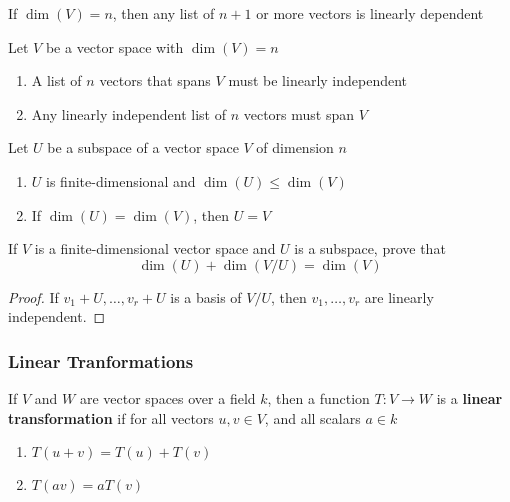 \documentclass[11pt]{article}
\begin{document}
\begin{corollary}[]
If \(\dim(V)=n\), then any list of \(n+1\) or more vectors is linearly dependent
\end{corollary}

\begin{corollary}[]
Let \(V\) be a vector space with \(\dim(V)=n\)
\begin{enumerate}
\item A list of \(n\) vectors that spans \(V\) must be linearly independent
\item Any linearly independent list of \(n\) vectors must span \(V\)
\end{enumerate}
\end{corollary}

\begin{corollary}[]
Let \(U\) be a subspace of a vector space \(V\) of dimension \(n\)
\begin{enumerate}
\item \(U\) is finite-dimensional and \(\dim(U)\le\dim(V)\)
\item If \(\dim(U)=\dim(V)\), then \(U=V\)
\end{enumerate}
\end{corollary}

\begin{exercise}
\label{nex2.77}
If \(V\) is a finite-dimensional vector space and \(U\) is a subspace, prove
that
\begin{equation*}
\dim(U)+\dim(V/U)=\dim(V)
\end{equation*}
\end{exercise}

\begin{proof}
If \(v_1+U,\dots,v_r+U\) is a basis of \(V/U\), then \(v_1,\dots,v_r\) are linearly independent.
\end{proof}
\subsubsection{Linear Tranformations}
\label{sec:orgf718f79}
\begin{definition}[]
If \(V\) and \(W\) are vector spaces over a field \(k\), then a function
\(T:V\to W\) is a \textbf{linear transformation} if for all vectors \(u,v\in V\), and
all scalars \(a\in k\)
\begin{enumerate}
\item \(T(u+v)=T(u)+T(v)\)
\item \(T(av)=aT(v)\)
\end{enumerate}
\end{definition}
\end{document}
